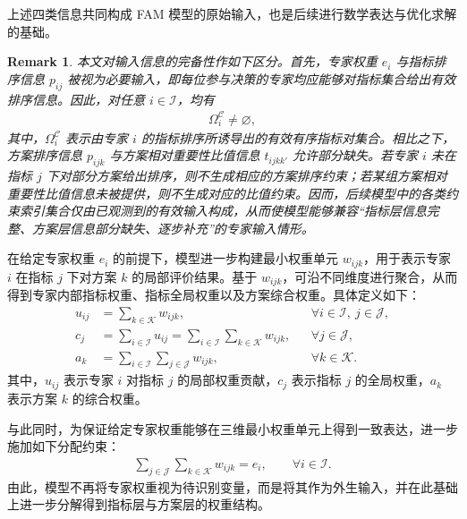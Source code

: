 \documentclass{article}
\newtheorem{remark}{Remark}
\begin{document}
上述四类信息共同构成 FAM 模型的原始输入，也是后续进行数学表达与优化求解的基础。

\begin{remark}
本文对输入信息的完备性作如下区分。首先，专家权重 $e_i$ 与指标排序信息 $p_{ij}$ 被视为必要输入，即每位参与决策的专家均应能够对指标集合给出有效排序信息。因此，对任意 $i\in\mathcal{I}$，均有
\begin{align}
    \Omega_i^{\mathcal C}\neq \varnothing,
\end{align}
其中，$\Omega_i^{\mathcal C}$ 表示由专家 $i$ 的指标排序所诱导出的有效有序指标对集合。相比之下，方案排序信息 $p_{ijk}$ 与方案相对重要性比值信息 $t_{ijkk'}$ 允许部分缺失。若专家 $i$ 未在指标 $j$ 下对部分方案给出排序，则不生成相应的方案排序约束；若某组方案相对重要性比值信息未被提供，则不生成对应的比值约束。因而，后续模型中的各类约束索引集合仅由已观测到的有效输入构成，从而使模型能够兼容“指标层信息完整、方案层信息部分缺失、逐步补充”的专家输入情形。
\end{remark}

在给定专家权重 $e_i$ 的前提下，模型进一步构建最小权重单元 $w_{ijk}$，用于表示专家 $i$ 在指标 $j$ 下对方案 $k$ 的局部评价结果。基于 $w_{ijk}$，可沿不同维度进行聚合，从而得到专家内部指标权重、指标全局权重以及方案综合权重。具体定义如下：
\begin{align}
    u_{ij} &= \sum_{k\in\mathcal{K}} w_{ijk},
    && \forall i\in\mathcal{I},\ j\in\mathcal{J}, \\
    c_j &= \sum_{i\in\mathcal{I}} u_{ij}
    = \sum_{i\in\mathcal{I}}\sum_{k\in\mathcal{K}} w_{ijk},
    && \forall j\in\mathcal{J}, \\
    a_k &= \sum_{i\in\mathcal{I}}\sum_{j\in\mathcal{J}} w_{ijk},
    && \forall k\in\mathcal{K}.
\end{align}
其中，$u_{ij}$ 表示专家 $i$ 对指标 $j$ 的局部权重贡献，$c_j$ 表示指标 $j$ 的全局权重，$a_k$ 表示方案 $k$ 的综合权重。

与此同时，为保证给定专家权重能够在三维最小权重单元上得到一致表达，进一步施加如下分配约束：
\begin{align}
    \sum_{j\in\mathcal{J}}\sum_{k\in\mathcal{K}} w_{ijk}=e_i,
    \qquad \forall i\in\mathcal{I}.
\end{align}
由此，模型不再将专家权重视为待识别变量，而是将其作为外生输入，并在此基础上进一步分解得到指标层与方案层的权重结构。
\end{document}
